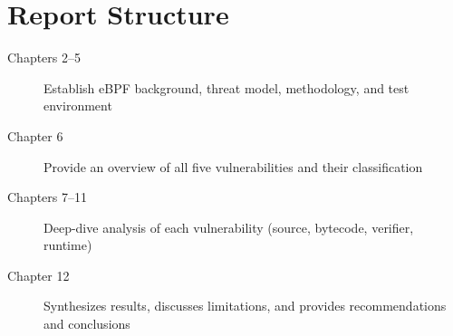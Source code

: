 \section{Report Structure}

\begin{description}
  \item[Chapters 2--5] Establish eBPF background, threat model, methodology, and test environment
  \item[Chapter 6] Provide an overview of all five vulnerabilities and their classification
  \item[Chapters 7--11] Deep-dive analysis of each vulnerability (source, bytecode, verifier, runtime)
  \item[Chapter 12] Synthesizes results, discusses limitations, and provides recommendations and conclusions
\end{description}
